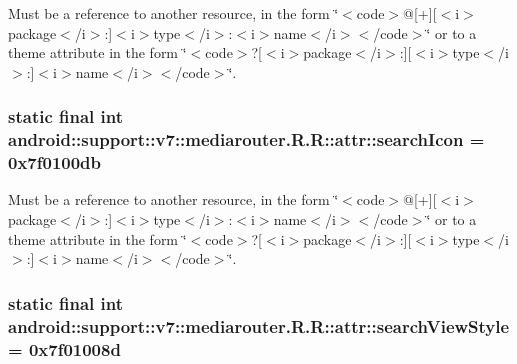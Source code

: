 Must be a reference to another resource, in the form \char`\"{}$<$code$>$@\mbox{[}+\mbox{]}\mbox{[}$<$i$>$package$<$/i$>$:\mbox{]}$<$i$>$type$<$/i$>$:$<$i$>$name$<$/i$>$$<$/code$>$\char`\"{} or to a theme attribute in the form \char`\"{}$<$code$>$?\mbox{[}$<$i$>$package$<$/i$>$:\mbox{]}\mbox{[}$<$i$>$type$<$/i$>$:\mbox{]}$<$i$>$name$<$/i$>$$<$/code$>$\char`\"{}. \hypertarget{classandroid_1_1support_1_1v7_1_1mediarouter_1_1_r_1_1attr_3c6a95c2b2f0d6c065a29795993318cc}{
\subsubsection[{searchIcon}]{\setlength{\rightskip}{0pt plus 5cm}static final int android::support::v7::mediarouter.R.R::attr::searchIcon = 0x7f0100db}}
\label{classandroid_1_1support_1_1v7_1_1mediarouter_1_1_r_1_1attr_3c6a95c2b2f0d6c065a29795993318cc}


Must be a reference to another resource, in the form \char`\"{}$<$code$>$@\mbox{[}+\mbox{]}\mbox{[}$<$i$>$package$<$/i$>$:\mbox{]}$<$i$>$type$<$/i$>$:$<$i$>$name$<$/i$>$$<$/code$>$\char`\"{} or to a theme attribute in the form \char`\"{}$<$code$>$?\mbox{[}$<$i$>$package$<$/i$>$:\mbox{]}\mbox{[}$<$i$>$type$<$/i$>$:\mbox{]}$<$i$>$name$<$/i$>$$<$/code$>$\char`\"{}. \hypertarget{classandroid_1_1support_1_1v7_1_1mediarouter_1_1_r_1_1attr_a9c2a37433293213b9cbc81cded7fa30}{
\subsubsection[{searchViewStyle}]{\setlength{\rightskip}{0pt plus 5cm}static final int android::support::v7::mediarouter.R.R::attr::searchViewStyle = 0x7f01008d}}
\label{classandroid_1_1support_1_1v7_1_1mediarouter_1_1_r_1_1attr_a9c2a37433293213b9cbc81cded7fa30}


